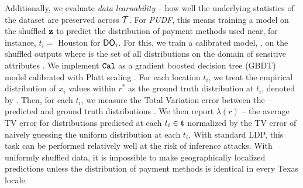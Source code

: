 Additionally, we evaluate \emph{data learnability} --  how well the underlying statistics of the dataset are preserved across $\mathcal{T}$. %
For \textit{PUDF}, this means training a model on the shuffled $\mathbf{z}$ to predict the distribution of payment methods used near, for instance, $t_i=$ Houston for $\textsf{DO}_i$. For this, we train a calibrated model, , on the shuffled outputs where  is the set of all distributions on the domain of sensitive attributes \scalebox{1}{$\calX$}. We implement $\texttt{Cal}$ as a gradient boosted decision tree (GBDT) model \citep{gradientboosting} calibrated with Platt scaling \citep{calibration}. For each location $t_i$, we treat the empirical distribution of $x_i$ values within $r^*$ as the ground truth distribution at $t_i$, denoted by . Then, for each $t_i$, we measure the Total Variation error between the predicted and ground truth distributions . We then report $\lambda(r)$ -- the average TV error for distributions predicted at each $t_i \in \mathbf{t}$ normalized by the TV error of naively guessing the uniform distribution at each $t_i$. With standard \textsf{LDP}, this task can be performed relatively well at the risk of inference attacks. With uniformly shuffled data, it is impossible to make geographically localized predictions unless the distribution of payment methods is identical in every Texas locale. 
 



